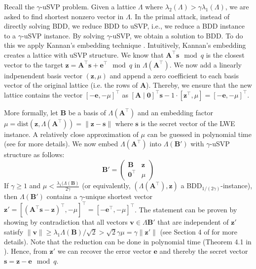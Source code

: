 Recall the $\gamma$-uSVP problem. Given a lattice $\Lambda$ where $\lambda_2(\Lambda) > \gamma \lambda_1(\Lambda)$, we are asked to find shortest nonzero vector in $\Lambda$. 
In the primal attack, instead of directly solving BDD, we reduce BDD to uSVP, i.e., we reduce a BDD instance to a $\gamma$-uSVP instance. By solving $\gamma$-uSVP, we obtain a solution to BDD. 
To do this we apply Kannan's embedding technique \cite{Kan87}. %
Intuitively, Kannan's embedding creates a lattice with uSVP structure. We know that $\mathbf{A}^\intercal \mathbf{s}\mod q$ is the closest vector to the target $\mathbf{z} =\mathbf{A}^\intercal \mathbf{s} + \mathbf{e}^\intercal \mod q$ in $\Lambda(\mathbf{A}^\intercal)$. We now add a linearly indpenendent basis vector  $(\mathbf{z}, \mu)$ and append a zero coefficient to each basis vector of the original lattice (i.e. the rows of $\mathbf{A}$). Thereby, we ensure that the new lattice contains the vector $[-\mathbf{e}, -\mu]^\intercal$ as $[\mathbf{A} \mid \mathbf{0}]^\intercal \mathbf{s} - 1 \cdot [\mathbf{z}^\intercal, \mu] = [-\mathbf{e}, -\mu]^\intercal$. 

More formally, let $\mathbf{B}$ be a basis of $\Lambda(\mathbf{A}^\intercal)$ %
and an embedding factor $\mu = \text{dist}(\mathbf{z}, \Lambda(\mathbf{A}^\intercal)) = \| \mathbf{z} - \mathbf{s}\|$ where $\mathbf{s}$ is the secret vector of the LWE instance. A relatively close approximation of $\mu$ can be guessed in polynomial time (see \cite{LM09} for more details). We now embed $\Lambda(\mathbf{A}^\intercal)$ into $\Lambda(\mathbf{B}')$ with $\gamma$-uSVP structure as follows: %
\begin{equation}
  \mathbf{B}' = \begin{pmatrix}
    \mathbf{B} & \mathbf{z}\\
    \mathbf{0}^\intercal & \mu
  \end{pmatrix}
\end{equation}
If $\gamma \geq 1$ and $\mu < \frac{\lambda_1(\Lambda(\mathbf{B})}{2\gamma}$ (or equivalently, $(\Lambda(\mathbf{A}^\intercal), \mathbf{z})$ a BDD$_{1/(2\gamma)}$-instance), then $\Lambda(\mathbf{B}')$ contains a $\gamma$-unique shortest vector $\mathbf{z}' = \left[(\mathbf{A}^\intercal\mathbf{s} - \mathbf{z})^\intercal, -\mu\right]^\intercal = \left[-\mathbf{e}^\intercal, -\mu\right]^\intercal$. 
The statement can be proven by showing by contradiction that all vectors $\mathbf{v} \in \Lambda{\mathbf{B}'}$ that are independent of $\mathbf{z}'$ satisfy $\| \mathbf{v}\| \geq \lambda_1{\Lambda(\mathbf{B})}/\sqrt{2} > \sqrt{2}\gamma \mu = \gamma \|\mathbf{z}'\|$ (see Section 4 of \cite{LM09} for more details). Note that the reduction can be done in polynomial time (Theorem 4.1 in \cite{LM09}).%
Hence, from $\mathbf{z}'$ we can recover the error vector $\mathbf{e}$ and thereby the secret vector $\mathbf{s} = \mathbf{z} - \mathbf{e} \mod q$. 

